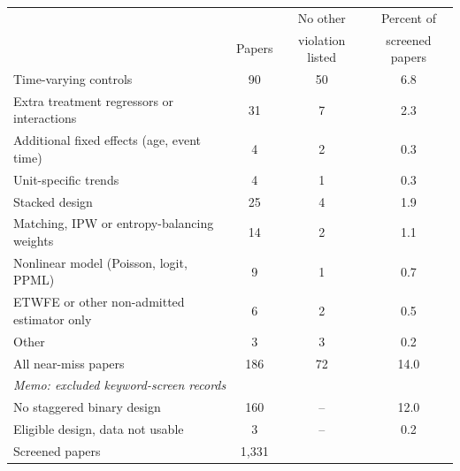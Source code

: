 \begin{tabular}{lccc}
\toprule
 & & No other & Percent of \\
 & Papers & violation listed & screened papers \\
\midrule
Time-varying controls & 90 & 50 & 6.8 \\
Extra treatment regressors or interactions & 31 & 7 & 2.3 \\
Additional fixed effects (age, event time) & 4 & 2 & 0.3 \\
Unit-specific trends & 4 & 1 & 0.3 \\
Stacked design & 25 & 4 & 1.9 \\
Matching, IPW or entropy-balancing weights & 14 & 2 & 1.1 \\
Nonlinear model (Poisson, logit, PPML) & 9 & 1 & 0.7 \\
ETWFE or other non-admitted estimator only & 6 & 2 & 0.5 \\
Other & 3 & 3 & 0.2 \\
\midrule
All near-miss papers & 186 & 72 & 14.0 \\
\midrule
\multicolumn{4}{l}{\emph{Memo: excluded keyword-screen records}} \\
No staggered binary design & 160 & -- & 12.0 \\
Eligible design, data not usable & 3 & -- & 0.2 \\
\midrule
Screened papers & 1,331 & & \\
\bottomrule
\end{tabular}
